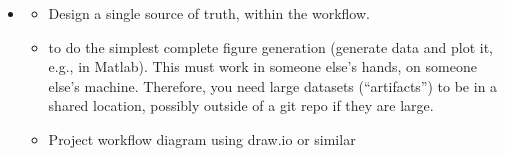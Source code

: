 \documentclass[letterpaper,10pt,english]{sphinxmanual}
\begin{document}
\begin{itemize}
\begin{description}
\begin{itemize}
\item {} 
\sphinxhyphen{}20\% of time “refactoring” (improving the code even if it’s working fine as is). An expression from software engineering is “technical debt”, the amount of disorganized clutter that slows future progress. How much time should you spend paying down technical debt (re\sphinxhyphen{}organizing your notes and directory structure, taking notes) versus producing results? This is called “refactoring”. We debated this percent a lot and this is the range that emerged.

\end{itemize}

\end{description}

\item {} \begin{description}
\begin{itemize}
\item {} 
\sphinxAtStartPar
Design a single source of truth, within the workflow.

\item {} 
\sphinxAtStartPar
{} to do the simplest complete figure generation (generate data and plot it, e.g., in Matlab). This must work in someone else’s hands, on someone else’s machine. Therefore, you need large datasets (“artifacts”) to be in a shared location, possibly outside of a git repo if they are large.

\item {} 
\sphinxAtStartPar
Project workflow diagram using draw.io or similar

\end{itemize}

\end{description}

\end{itemize}

\sphinxstepscope
\end{document}

